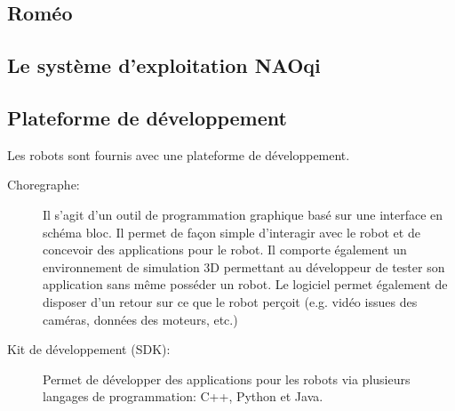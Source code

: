 \subsection{Roméo}
\label{Entreprise: Les produits: Roméo}

\subsection{Le système d'exploitation NAOqi}
\label{Entreprise: Les produits: NAOqi}

\subsection{Plateforme de développement}
\label{Entreprise:Les produits: Nao: Plateforme de développement}
Les robots sont fournis avec une plateforme de développement.
\begin{description}
	\item[Choregraphe:] Il s'agit d'un outil de programmation graphique basé sur une interface en schéma bloc. Il permet de façon simple d'interagir avec le robot et de concevoir des applications pour le robot. Il comporte également un environnement de simulation 3D permettant au développeur de tester son application sans même posséder un robot. Le logiciel permet également de disposer d'un retour sur ce que le robot perçoit (e.g. vidéo issues des caméras, données des moteurs, etc.)
	
	\item[Kit de développement (SDK):] Permet de développer des applications pour les robots via plusieurs langages de programmation:  C++, Python et Java.
\end{description}

